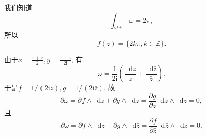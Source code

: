 \documentclass[a4paper,12pt]{ctexart}
\newcommand{\diff}{\mathop{}\!\mathrm{d}}
\newcommand{\mi}{\mathrm{i}}
\begin{document}
    \begin{solution}
        我们知道
        \begin{equation}
            \int_{\mathbb{S}^{1+}}{\omega} = 2\pi,
        \end{equation}
        所以
        \begin{equation}
            f(z) = \{2k\pi, k\in\mathbb{Z}\}.
        \end{equation}

        由于$\displaystyle x=\frac{z+\bar{z}}{2}, y=\frac{z-\bar{z}}{2\mi}$,
        有
        \begin{equation}
            \omega = \frac{1}{2\mi}(\frac{\diff z}{z}+\frac{\diff \bar{z}}{\bar{z}}). 
        \end{equation}
        于是$f=1/(2\mi z), g=1/(2\mi\bar{z})$.
        故
        \begin{equation}
            \partial\omega=\partial f\wedge\diff z
                +\partial g\wedge\diff \bar{z}
            =
            \frac{\partial g}{\partial z}\diff z\wedge\diff \bar{z}
            =
            0,
        \end{equation}
        且
        \begin{equation}
            \bar{\partial}\omega=\bar{\partial} f\wedge\diff z
                +\bar{\partial} g\wedge\diff \bar{z}
            =
            \frac{\partial f}{\partial \bar{z}}\diff \bar{z}\wedge\diff z
            =
            0.
        \end{equation}
    \end{solution}


\end{document}
